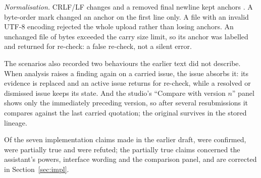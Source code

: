 \emph{Normalisation.} CRLF/LF changes and a removed final newline kept anchors . A byte-order mark changed an anchor on the first line only. A file with an invalid UTF-8 encoding rejected the whole upload rather than losing anchors. An unchanged file of \wpdBigFileBytes{} bytes exceeded the carry size limit, so its anchor was labelled  and returned for re-check: a false re-check, not a silent error.

The scenarios also recorded two behaviours the earlier text did not describe. When analysis raises a finding again on a carried issue, the issue absorbs it: its evidence is replaced and an active issue returns for re-check, while a resolved or dismissed issue keeps its state. And the studio's ``Compare with version $n$'' panel shows only the immediately preceding version, so after several resubmissions it compares against the last carried quotation; the original survives in the stored lineage.

Of the seven implementation claims made in the earlier draft, \wpdClaimsConfirmed{} were confirmed, \wpdClaimsPartial{} were partially true and \wpdClaimsRefuted{} were refuted; the partially true claims concerned the assistant's powers, interface wording and the comparison panel, and are corrected in Section~\ref{sec:impl}.
